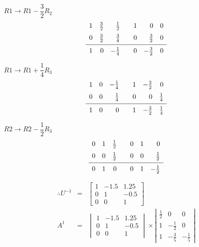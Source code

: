 \documentclass[a4paper,11pt]{article}
\begin{document}
\( R1 \rightarrow R1 - \dfrac{3}{2} R_2 \)
\[ \begin{array}{rrrrrrr}
1 & \frac{3}{2} & \frac{1}{2} && 1 & 0 & 0 \\ [2mm]
0 & \frac{3}{2} & \frac{3}{4} && 0 & \frac{3}{2} & 0 \\ [-3mm]
&&&&&& \\ \hline
&&&&&& \\  [-3mm]
1 & 0 & -\frac{1}{4} && 0 & -\frac{3}{2} & 0
\end{array} \]

\( R1 \rightarrow R1 + \dfrac{1}{4} R_3 \)
\[ \begin{array}{rrrrrrr}
1 & 0 & -\frac{1}{4} && 1 & -\frac{3}{2} & 0 \\ [2mm]
0 & 0 & \frac{1}{4} && 0 & 0 & \frac{1}{4} \\ [-3mm]
&&&&&& \\ \hline
&&&&&& \\  [-3mm]
1 & 0 & 0 && 1 & -\frac{3}{2} & \frac{1}{4}
\end{array} \]

\( R2 \rightarrow R2 - \dfrac{1}{2} R_3 \)
\[ \begin{array}{rrrrrrr}
0 & 1 & \frac{1}{2} && 0 & 1 & 0 \\ [2mm]
0 & 0 & \frac{1}{2} && 0 & 0 & \frac{1}{2} \\ [-3mm]
&&&&&& \\ \hline
&&&&&& \\  [-3mm]
0 & 1 & 0 && 0 & 1 & -\frac{1}{2}
\end{array} \]

\[\begin{array}{rcl}
    \therefore U^{-1} &=& \begin{bmatrix} 1 & -1.5 & 1.25 \\ 0 & 1 & -0.5 \\ 0 & 0 & 1 \end{bmatrix} \\ [8mm]
    A^1 &=& \begin{vmatrix}
        1 & -1.5 & 1.25 \\
        0 & 1 & -0.5 \\
        0 & 0 & 1
    \end{vmatrix} \times 
    \left|\begin{array}{rrr}
        \frac{1}{2} & 0 & 0 \\ [2mm]
        1 & -\frac{1}{2} & 0 \\ [2mm]
        1 & -\frac{3}{5} & -\frac{1}{5}
    \end{array}\right|
\end{array}\]
\end{document}
